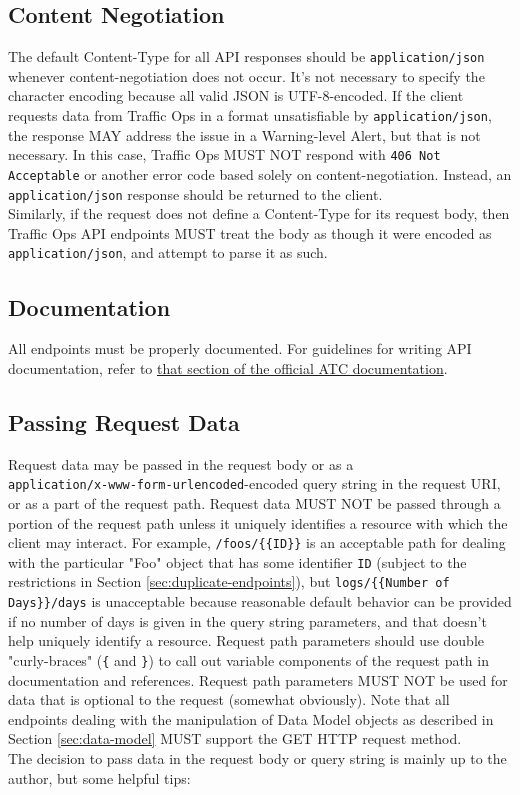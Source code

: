 \documentclass{article}
\newcommand{\code}[1]{\texttt{\color{inlinecodecolor}#1}}
\begin{document}
\subsection{Content Negotiation}
The default Content-Type for all API responses should be \code{application/json} whenever content-negotiation does not occur. It's not
necessary to specify the character encoding because all valid JSON is UTF-8-encoded. If the client requests data from Traffic Ops in a
format unsatisfiable by \code{application/json}, the response MAY address the issue in a Warning-level Alert, but that is not
necessary. In this case, Traffic Ops MUST NOT respond with \code{406 Not Acceptable} or another error code based solely on content-negotiation.
Instead, an \code{application/json} response should be returned to the client.\\
Similarly, if the request does not define a Content-Type for its request body, then Traffic Ops API endpoints MUST treat the body as though it
were encoded as \code{application/json}, and attempt to parse it as such.

\subsection{Documentation}
All endpoints must be properly documented. For guidelines for writing API documentation, refer to
\href{https://traffic-control-cdn.readthedocs.io/en/latest/development/documentation_guidelines.html#documenting-api-routes}{that section of the official ATC documentation}.

\subsection{Passing Request Data}
Request data may be passed in the request body or as a\\ \code{application/x-www-form-urlencoded}-encoded query string in the request URI, or as a part of the
request path. Request data MUST NOT be passed through a portion of the request path unless it uniquely identifies a resource with which the client may
interact. For example, \code{/foos/\{\{ID\}\}} is an acceptable path for dealing with the particular "Foo" object that has some identifier \code{ID} (subject
to the restrictions in Section \ref{sec:duplicate-endpoints}), but \code{logs/\{\{Number of Days\}\}/days} is unacceptable because reasonable default behavior can
be provided if no number of days is given in the query string parameters, and that doesn't help uniquely identify a resource. Request path parameters should
use double "curly-braces" (\code{\{} and \code{\}}) to call out variable components of the request path in documentation and references. Request path parameters
MUST NOT be used for data that is optional to the request (somewhat obviously). Note that all endpoints dealing with the manipulation of Data Model objects as
described in Section \ref{sec:data-model} MUST support the GET HTTP request method.\\
The decision to pass data in the request body or query string is mainly up to the author, but some helpful tips:
\end{document}
